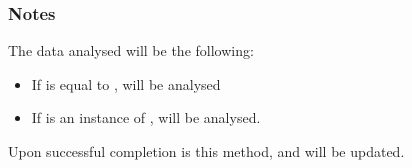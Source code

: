 \documentclass[letterpaper,10pt,english]{sphinxmanual}
\begin{document}
\begin{fulllineitems}
\begin{fulllineitems}
\subsubsection*{Notes}

\sphinxAtStartPar
The data analysed will be the following:
\begin{itemize}
\item {} 
\sphinxAtStartPar
If  is equal to ,  will be
analysed

\item {} 
\sphinxAtStartPar
If  is an instance of
{\hyperref[\detokenize{references/freqfilter:nmrespy.freqfilter.FrequencyFilter}]{}},
 will be analysed.

\end{itemize}

\sphinxAtStartPar
Upon successful completion is this method,  and
 will be updated.


\nopagebreak


\sphinxAtStartPar
{\hyperref[\detokenize{references/nlp/nlp:nmrespy.nlp.nlp.NonlinearProgramming}]{}}



\end{fulllineitems}



\end{fulllineitems}
\end{document}
